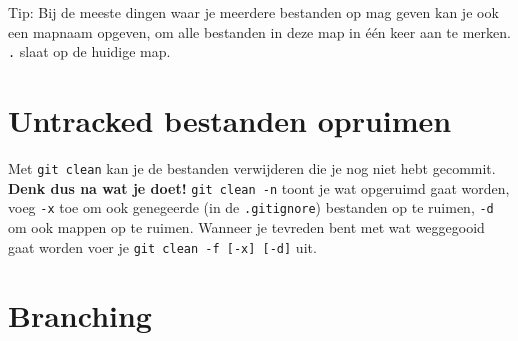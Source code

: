 \documentclass[9pt,a4paper]{extarticle}
\newcommand{\shell}[1]{\texttt{#1}}
\begin{document}
Tip: Bij de meeste dingen waar je meerdere bestanden op mag geven kan je ook een mapnaam opgeven, om
alle bestanden in deze map in \'e\'en keer aan te merken. \texttt{.} slaat op de huidige map.

\section*{Untracked bestanden opruimen}
Met \shell{git clean} kan je de bestanden verwijderen die je nog niet hebt gecommit.
\textbf{Denk dus na wat je doet!} \shell{git clean -n} toont je wat opgeruimd gaat worden, voeg \shell{-x} toe om
ook genegeerde (in de \shell{.gitignore}) bestanden op te ruimen, \shell{-d} om ook mappen op te ruimen. Wanneer je tevreden bent met wat weggegooid
gaat worden voer je \danger{} \shell{git clean -f [-x] [-d]} \danger{} uit.


\section*{Branching}
\settowidth{\OptieBreed}{\shell{git checkout --no-merged }}
\end{document}
